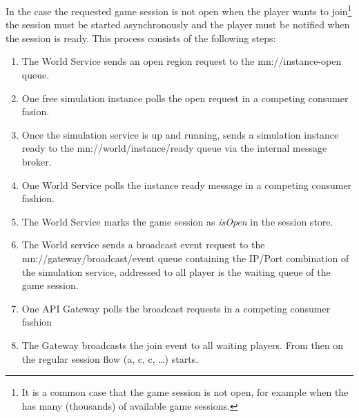 In the case the requested game session is not open when the player wants to
join\footnote{It is a common case that the game session is not open, for
example when the \og{} has many (thousands) of available game sessions.} the
session must be started asynchronously and the player must be notified when the
session is ready. This process consists of the following steps:



\begin{enumerate}[label=\Alph*.]
    \item The World Service sends an open region request to the
    mn://instance-open queue.
    \item One free simulation instance polls the open request in a competing
    consumer fasion.
    \item Once the simulation service is up and running, sends a simulation
    instance ready to the mn://world/instance/ready queue via the internal
    message broker.
    \item One World Service polls the instance ready message in a competing
    consumer fashion.
    \item The World Service marks the game session as \textit{isOpen} in the
    session store.
    \item The World service sends a broadcast event request to the
    mn://gateway/broadcast/event queue containing the IP/Port combination of the
    simulation service, addressed to all player is the waiting queue of the game
    session.
    \item One API Gateway polls the broadcast requests in a competing consumer
    fashion
    \item The Gateway broadcasts the join event to all waiting players. From
    then on the regular session flow (a, c, c, \ldots) starts.
\end{enumerate}




